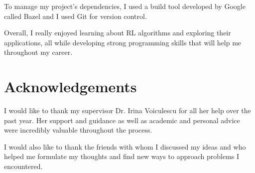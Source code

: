 \documentclass[11pt,a4paper,twoside,openright]{report}
\begin{document}
To manage my project's dependencies, I used a build tool developed by Google called Bazel and I used Git for version control.

Overall, I really enjoyed learning about RL algorithms and exploring their applications, all while developing strong programming skills that will help me throughout my career.


\section{Acknowledgements}

I would like to thank my supervisor Dr. Irina Voiculescu for all her help over the past year. Her support and guidance as well as academic and personal advice were incredibly valuable throughout the process.

I would also like to thank the friends with whom I discussed my ideas and who helped me formulate my thoughts and find new ways to approach problems I encountered.


\newpage


{}

\end{document}

